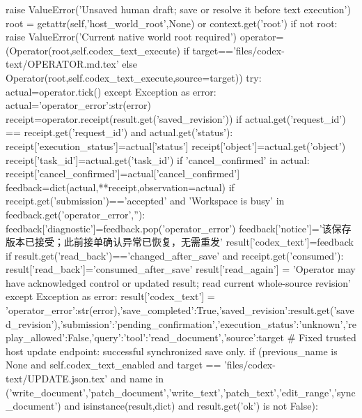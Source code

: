                         raise ValueError('Unsaved human draft; save or resolve it before text execution')
                    root = getattr(self,'host_world_root',None) or context.get('root')
                    if not root: raise ValueError('Current native world root required')
                    operator=(Operator(root,self.codex_text_execute) if target=='files/codex-text/OPERATOR.md.tex' else Operator(root,self.codex_text_execute,source=target))
                    try:
                        actual=operator.tick()
                    except Exception as error:
                        actual={'operator_error':str(error)}
                    receipt=operator.receipt(result.get('saved_revision'))
                    if actual.get('request_id') == receipt.get('request_id') and actual.get('status'):
                        receipt['execution_status']=actual['status']
                        receipt['object']=actual.get('object')
                        receipt['task_id']=actual.get('task_id')
                        if 'cancel_confirmed' in actual:
                            receipt['cancel_confirmed']=actual['cancel_confirmed']
                    feedback=dict(actual,**receipt,observation=actual)
                    if receipt.get('submission')=='accepted' and 'Workspace is busy' in feedback.get('operator_error',''):
                        feedback['diagnostic']=feedback.pop('operator_error')
                        feedback['notice']='该保存版本已接受；此前接单确认异常已恢复，无需重发'
                    result['codex_text']=feedback
                    if result.get('read_back')=='changed_after_save' and receipt.get('consumed'):
                        result['read_back']='consumed_after_save'
                    result['read_again'] = 'Operator may have acknowledged control or updated result; read current whole-source revision'
                except Exception as error:
                    result['codex_text'] = {'operator_error':str(error),'save_completed':True,'saved_revision':result.get('saved_revision'),'submission':'pending_confirmation','execution_status':'unknown','replay_allowed':False,'query':{'tool':'read_document','source':target}}
            # Fixed trusted host update endpoint: successful synchronized save only.
            if (previous_name is None and self.codex_text_enabled
                    and target == 'files/codex-text/UPDATE.json.tex'
                    and name in ('write_document','patch_document','write_text','patch_text','edit_range','sync_document')
                    and isinstance(result,dict) and result.get('ok') is not False):
